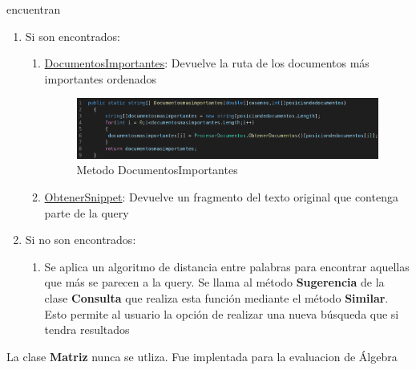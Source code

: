\documentclass{article}
\begin{document}
 encuentran
 \begin{enumerate}
  \item Si son encontrados:
  \begin{enumerate}
    \item \underline{DocumentosImportantes}: Devuelve la ruta de los documentos más importantes
    ordenados 
    \begin{figure}[h]
      \centering
      \includegraphics[width = 15cm]{fig 4.png}
      \caption{Metodo DocumentosImportantes}
      \label{fig:4}
    \end{figure}
    \item \underline{ObtenerSnippet}: Devuelve un fragmento del texto original que contenga parte
    de la query
  \end{enumerate}
  \item Si no son encontrados:
  \begin{enumerate}
    \item Se aplica un algoritmo de distancia entre palabras para encontrar aquellas que más se
    parecen a la query. Se llama al método \textbf{Sugerencia} de la clase \textbf{Consulta} que
    realiza esta función mediante el método \textbf{Similar}. Esto permite al usuario la opción
    de realizar una nueva búsqueda que si tendra resultados 
  \end{enumerate}
 \end{enumerate}
 La clase \textbf{Matriz} nunca se utliza. Fue implentada para la evaluacion de Álgebra
\end{document}
